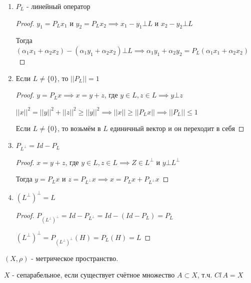 \begin{properties}
    \begin{enumerate}
        \item { $P_L$ - линейный оператор
            \begin{proof}
                $y_1 = P_L x_1$ и $y_2 = P_L x_2 \implies x_1 - y_1 \bot L$ и $x_2 - y_2 \bot L$

                Тогда $(\alpha_1 x_1 + \alpha_2 x_2) - (\alpha_1 y_1 + \alpha_2 x_2) \bot L \implies \alpha_1 y_1 + \alpha_2 y_2 = P_L (\alpha_1 x_1 + \alpha_2 x_2)$
            \end{proof}
        }
        \item {
            Если $L \neq \{ 0 \}$, то $||P_L|| = 1$

            \begin{proof}
                $y = P_L x \implies x = y + z$, где $y \in L, z \in L \implies y \bot z$

                $||x||^2 = ||y||^2 + ||z||^2 \geqslant ||y||^2 \implies ||x|| \geqslant ||P_L x|| \implies ||P_L|| \leqslant 1$

                Если $L \neq \{ 0 \}$, то возьмём в $L$ единичный вектор и он переходит в себя
            \end{proof}
        }
        \item {
            $P_{L^\bot} = Id - P_L$

            \begin{proof}
                $x = y + z$, где $y \in L, z \in L \implies Z \in L^\bot$ и $y \bot L^\bot$

                Тогда $y = P_L x$ и $z = P_{L^\bot} x \implies x = P_{L} x + P_{L^\bot} x$
            \end{proof}
        }
        \item {
            $(L^\bot)^\bot = L$  

            \begin{proof}
                $P_{(L^\bot)^\bot} = Id - P_{L^\bot} = Id - (Id - P_L) = P_L$

                $(L^\bot)^\bot = P_{(L^\bot)^\bot} (H) = P_L (H) = L$
            \end{proof}
        }
    \end{enumerate}
\end{properties}

\begin{definition}
    $(X, \rho)$ - метрическое пространство.

    $X$ - сепарабельное, если существует счётное множество $A \subset X$, т.ч. $Cl \, A = X$
\end{definition}


